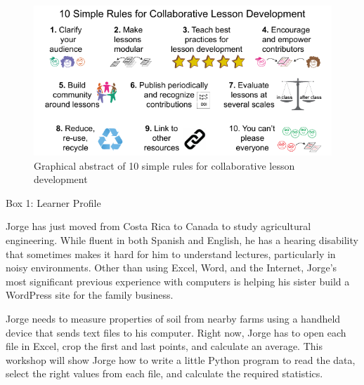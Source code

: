 \documentclass[10pt,letterpaper]{article}
\begin{document}
\begin{figure}[ht]  %
\includegraphics[width=\linewidth]{figure1}
\caption{Graphical abstract of 10 simple rules for collaborative lesson development}
\label{figure1}
\end{figure}
%

\begin{mdframed}

\noindent
Box 1: Learner Profile

Jorge has just moved from Costa Rica to Canada to study agricultural engineering.
While fluent in both Spanish and English,
he has a hearing disability that sometimes makes it hard for him to understand lectures,
particularly in noisy environments.
Other than using Excel, Word, and the Internet,
Jorge's most significant previous experience with computers is
helping his sister build a WordPress site for the family business.

Jorge needs to measure properties of soil from nearby farms
using a handheld device that sends text files to his computer.
Right now, Jorge has to open each file in Excel,
crop the first and last points,
and calculate an average.
This workshop will show Jorge how to write a little Python program
to read the data,
select the right values from each file,
and calculate the required statistics.

\end{mdframed}
\end{document}
